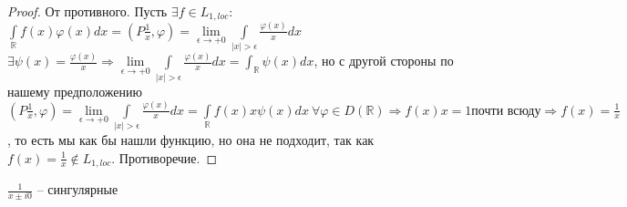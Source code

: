 \begin{enumerate}
\begin{example}
        \begin{proof}
             От противного. Пусть $\exists f \in L_{1, loc}$: $\int\limits_{\mathbb{R}} f(x) \varphi(x) d x = (P\frac{1}{x}, \varphi) = \lim\limits_{\epsilon \to +0} \int\limits_{|x| > \epsilon} \frac{\varphi(x)}{x} dx$ \\
             $\exists \psi (x) = \frac{\varphi (x)}{x} \Rightarrow \lim\limits_{\epsilon \to +0} \int\limits_{|x| > \epsilon} \frac{\varphi(x)}{x} dx = \int_{\mathbb{R}} \psi (x) d x$, но с другой стороны по нашему предположению $(P\frac{1}{x}, \varphi) = \lim\limits_{\epsilon \to +0} \int\limits_{|x| > \epsilon} \frac{\varphi(x)}{x} dx = \int\limits_{\mathbb{R}} f(x) x \psi(x) d x \ \forall \varphi \in D(\mathbb{R}) \Rightarrow f(x) x = 1 \text{почти всюду} \Rightarrow f(x) = \frac{1}{x}$, то есть мы как бы нашли функцию, но она не подходит, так как $f(x) = \frac{1}{x} \notin L_{1, loc}$. Противоречие.
        \end{proof}
    \end{example}
    \begin{exercise}
        $\frac{1}{x \pm i0}$ -- сингулярные
    \end{exercise}


\end{enumerate}

